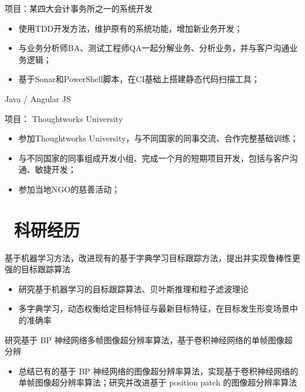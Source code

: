 \documentclass{resume}
\begin{document}
项目：某四大会计事务所之一的系统开发
\begin{itemize}
  \item 使用TDD开发方法，维护原有的系统功能，增加新业务开发；
  \item 与业务分析师BA、测试工程师QA一起分解业务、分析业务，并与客户沟通业务逻辑；
  \item 基于Sonar和PowerShell脚本，在CI基础上搭建静态代码扫描工具；
\end{itemize}

Java / Angular JS

项目： Thoughtworks University
\begin{itemize}
  \item 参加Thoughtworks University，与不同国家的同事交流、合作完整基础训练；
  \item 与不同国家的同事组成开发小组、完成一个月的短期项目开发，包括与客户沟通、敏捷开发；
  \item 参加当地NGO的慈善活动；
\end{itemize}


\section{\faUsers\ 科研经历}

\begin{onehalfspacing}
基于机器学习方法，改进现有的基于字典学习目标跟踪方法，提出并实现鲁棒性更强的目标跟踪算法
\begin{itemize}
  \item 研究基于机器学习的目标跟踪算法、贝叶斯推理和粒子滤波理论
  \item 多字典学习，动态权衡给定目标特征与最新目标特征，在目标发生形变场景中的准确率
\end{itemize}
\end{onehalfspacing}

\begin{onehalfspacing}
研究基于 BP 神经网络多帧图像超分辨率算法，基于卷积神经网络的单帧图像超分辨
\begin{itemize}
  \item 总结已有的基于 BP 神经网络的图像超分辨率算法，实现基于卷积神经网络的单帧图像超分辨率算法；研究并改进基于 position patch 的图像超分辨率算法
\end{itemize}
\end{onehalfspacing}
\end{document}
